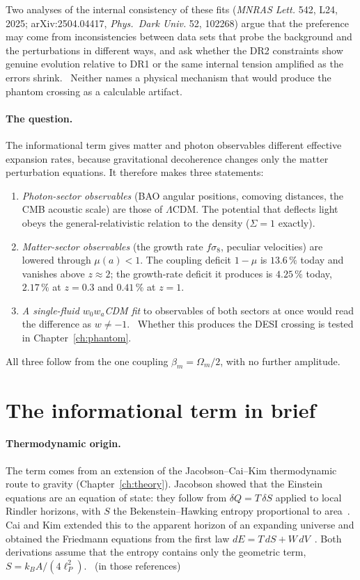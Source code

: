 Two analyses of the internal consistency of these fits (\emph{MNRAS Lett.} 542, L24, 2025; arXiv:\allowbreak{}2504.04417, \emph{Phys.\ Dark Univ.}
52, 102268) argue that the preference may come from inconsistencies between data sets that probe the background and the perturbations in different
ways, and ask whether the DR2 constraints show genuine evolution relative to DR1 or the same internal tension amplified as the errors shrink.
\observed\ Neither names a physical mechanism that would produce the phantom crossing as a calculable artifact.

\paragraph{The question.} The informational term gives matter and photon observables different effective expansion rates, because gravitational
decoherence changes only the matter perturbation equations. It therefore makes three statements:
\begin{enumerate}
\item \emph{Photon-sector observables} (BAO angular positions, comoving distances, the CMB acoustic scale) are those of $\Lambda$CDM. The
potential that deflects light obeys the general-relativistic relation to the density ($\Sigma=1$ exactly). \prediction
\item \emph{Matter-sector observables} (the growth rate $f\sigma_8$, peculiar velocities) are lowered through $\mu(a)<1$. The coupling deficit $1-\mu$ is
$13.6\,\%$ today and vanishes above $z\approx2$; the growth-rate deficit it produces is $4.25\,\%$ today, $2.17\,\%$ at $z=0.3$ and $0.41\,\%$ at $z=1$.
\prediction\ \calc
\item \emph{A single-fluid $w_0w_a$CDM fit} to observables of both sectors at once would read the difference as $w\neq-1$. \conjecture\ Whether this
produces the DESI crossing is tested in Chapter~\ref{ch:phantom}.
\end{enumerate}
All three follow from the one coupling $\beta_m=\Omega_m/2$, with no further amplitude.

\section{The informational term in brief}\label{sec:st_model}
\paragraph{Thermodynamic origin.} The term comes from an extension of the Jacobson--Cai--Kim thermodynamic route to gravity (Chapter~\ref{ch:theory}).
Jacobson showed that the Einstein equations are an equation of state: they follow from $\delta Q=T\,\delta S$ applied to local Rindler horizons, with $S$
the Bekenstein--Hawking entropy proportional to area~\cite{Jacobson1995}. Cai and Kim extended this to the apparent horizon of an expanding universe
and obtained the Friedmann equations from the first law $dE=T\,dS+W\,dV$~\cite{CaiKim2005}. Both derivations assume that the entropy contains only the
geometric term, $S=k_BA/(4\ell_P^2)$. \derived\ (in those references)

